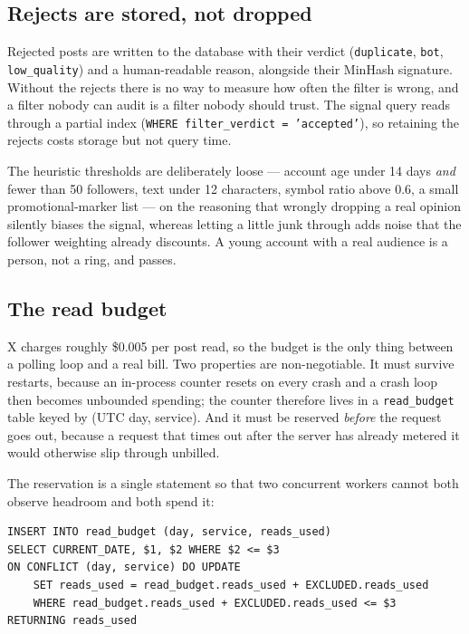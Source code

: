 \documentclass[11pt]{article}
\newcommand{\code}[1]{\texttt{\small #1}}
\begin{document}
\subsection{Rejects are stored, not dropped}

Rejected posts are written to the database with their verdict
(\code{duplicate}, \code{bot}, \code{low\_quality}) and a human-readable reason,
alongside their MinHash signature. Without the rejects there is no way to
measure how often the filter is wrong, and a filter nobody can audit is a filter
nobody should trust. The signal query reads through a partial index
(\code{WHERE filter\_verdict = 'accepted'}), so retaining the rejects costs
storage but not query time.

The heuristic thresholds are deliberately loose --- account age under 14 days
\emph{and} fewer than 50 followers, text under 12 characters, symbol ratio above
0.6, a small promotional-marker list --- on the reasoning that wrongly dropping
a real opinion silently biases the signal, whereas letting a little junk through
adds noise that the follower weighting already discounts. A young account with a
real audience is a person, not a ring, and passes.

\subsection{The read budget}

X charges roughly \$0.005 per post read, so the budget is the only thing between
a polling loop and a real bill. Two properties are non-negotiable. It must
survive restarts, because an in-process counter resets on every crash and a
crash loop then becomes unbounded spending; the counter therefore lives in a
\code{read\_budget} table keyed by (UTC day, service). And it must be reserved
\emph{before} the request goes out, because a request that times out after the
server has already metered it would otherwise slip through unbilled.

The reservation is a single statement so that two concurrent workers cannot both
observe headroom and both spend it:

\begin{lstlisting}
INSERT INTO read_budget (day, service, reads_used)
SELECT CURRENT_DATE, $1, $2 WHERE $2 <= $3
ON CONFLICT (day, service) DO UPDATE
    SET reads_used = read_budget.reads_used + EXCLUDED.reads_used
    WHERE read_budget.reads_used + EXCLUDED.reads_used <= $3
RETURNING reads_used
\end{lstlisting}
\end{document}
